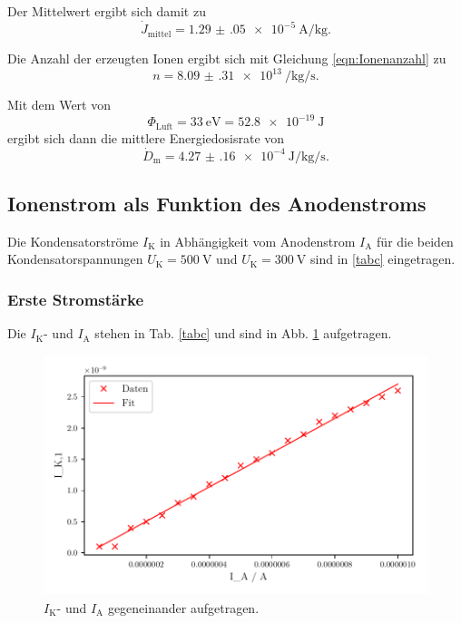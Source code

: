 Der Mittelwert ergibt sich damit zu 
\begin{equation*}
    \dot{J}_\text{mittel} = \SI{1.29(05)e-5}{\ampere\per\kilo\gram}.
\end{equation*}

Die Anzahl der erzeugten Ionen ergibt sich mit Gleichung \eqref{eqn:Ionenanzahl} zu 
\begin{equation*}
    n = \SI{8.09(31)e13}{\per\kilo\gram\per\second}.
\end{equation*}

Mit dem Wert von 
\begin{equation*}
    \Phi_\text{Luft} = \SI{33}{\electronvolt} = \SI{52.8e-19}{\joule}
\end{equation*}
ergibt sich dann die mittlere Energiedosisrate von 
\begin{equation*}
    \dot{D}_\text{m} = \SI{4.27(16)e-4}{\joule\per\kilo\gram\per\second}.
\end{equation*}


\subsection{Ionenstrom als Funktion des Anodenstroms}

Die Kondensatorströme $I_\text{K}$ in Abhängigkeit vom
Anodenstrom $I_\text{A}$ für die beiden Kondensatorspannungen
$U_\text{K} = \SI{500}{\volt}$ und $U_\text{K} = \SI{300}{\volt}$
sind in \ref{tabc} eingetragen.

\subsubsection{Erste Stromstärke}
Die $I_\text{K}$- und $I_\text{A}$ stehen in Tab. \ref{tabc} und sind in Abb. \ref{fig:plot1} aufgetragen. 



\begin{figure}
    \centering
    \includegraphics[width=12cm, height=7cm]{build/plot1.pdf}
    \caption{$I_\text{K}$- und $I_\text{A}$ gegeneinander aufgetragen.
    }
    \label{fig:plot1}
\end{figure}


